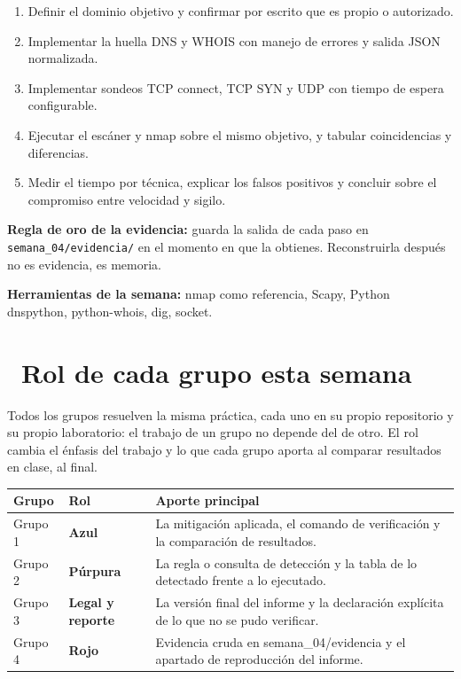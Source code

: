 \documentclass[11pt,a4paper]{article}
\newcommand{\iconotexto}[2]{\textcolor{cyanNeon}{\faIcon{#1}}~#2}
\begin{document}
\begin{enumerate}[leftmargin=1.4em,itemsep=2pt,topsep=3pt]
  \item Definir el dominio objetivo y confirmar por escrito que es propio o autorizado.
  \item Implementar la huella DNS y WHOIS con manejo de errores y salida JSON normalizada.
  \item Implementar sondeos TCP connect, TCP SYN y UDP con tiempo de espera configurable.
  \item Ejecutar el escáner y nmap sobre el mismo objetivo, y tabular coincidencias y diferencias.
  \item Medir el tiempo por técnica, explicar los falsos positivos y concluir sobre el compromiso entre velocidad y sigilo.
\end{enumerate}

\begin{cajaConcepto}\textbf{Regla de oro de la evidencia:} guarda la salida de cada paso en \texttt{semana\_04/evidencia/} en el momento en que la obtienes. Reconstruirla después no es evidencia, es memoria.
\end{cajaConcepto}

\textbf{Herramientas de la semana:} nmap como referencia, Scapy, Python dnspython, python-whois, dig, socket.

\section{\iconotexto{users}{Rol de cada grupo esta semana}}

Todos los grupos resuelven la misma práctica, cada uno en su propio repositorio y su propio laboratorio: el trabajo de un grupo no depende del de otro. El rol cambia el énfasis del trabajo y lo que cada grupo aporta al comparar resultados en clase, al final.

\begin{tabularx}{\linewidth}{@{}l l X@{}}
\toprule
Grupo & Rol & Aporte principal\\
\midrule
Grupo 1 & \textbf{Azul} & La mitigación aplicada, el comando de verificación y la comparación de resultados. \\
Grupo 2 & \textbf{Púrpura} & La regla o consulta de detección y la tabla de lo detectado frente a lo ejecutado. \\
Grupo 3 & \textbf{Legal y reporte} & La versión final del informe y la declaración explícita de lo que no se pudo verificar. \\
Grupo 4 & \textbf{Rojo} & Evidencia cruda en semana\_04/evidencia y el apartado de reproducción del informe. \\
\bottomrule
\end{tabularx}
\end{document}
